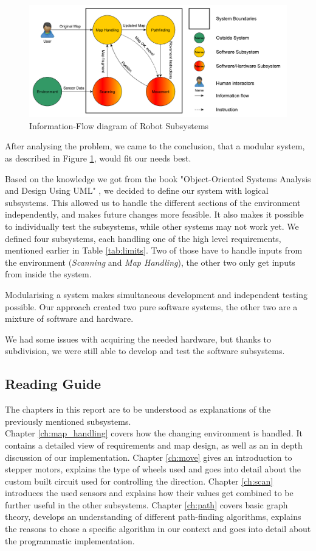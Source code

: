 \begin{figure}[!ht]
	\centering
	\includegraphics[width=\textwidth]{figures/intro/systemview}
	\caption{Information-Flow diagram of Robot Subsystems}
	\label{fig:system} 
\end{figure}
After analysing the problem,
we came to the conclusion,
that a modular system,
as described in Figure \ref{fig:system},
would fit our needs best.

Based on the knowledge we got from the book
"Object-Oriented Systems Analysis and Design  Using UML" \cite{Benett2010},
we decided to define our system with logical subsystems.
This allowed us to handle the different sections of the environment independently,
and makes future changes more feasible.
It also makes it possible to individually test the subsystems,
while other systems may not work yet.
We defined four subsystems, each handling one of the high level requirements,
mentioned earlier in Table \ref{tab:limits}.
Two of those have to handle inputs from the environment (\emph{Scanning} and \emph{Map Handling}),
the other two only get inputs from inside the system.

Modularising a system makes simultaneous development
and independent testing possible.
Our approach created two pure software systems,
the other two are a mixture of software and hardware.

We had some issues with acquiring the needed hardware,
but thanks to subdivision,
we were still able to develop and test the software subsystems.

\subsection*{Reading Guide}
The chapters in this report are to be understood as explanations of the previously mentioned subsystems.\\
Chapter \ref{ch:map_handling} covers how the changing environment is handled.
It contains a detailed view of requirements and map design,
as well as an in depth discussion of our implementation.
Chapter \ref{ch:move} gives an introduction to stepper motors, explains the type of wheels used and goes into detail about the custom built circuit used for controlling the direction.
Chapter \ref{ch:scan} introduces the used sensors and 
explains how their values get combined to be further useful in the other subsystems.
Chapter \ref{ch:path} covers basic graph theory,
develops an understanding of different path-finding algorithms,
explains the reasons to chose a specific algorithm in our context and
goes into detail about the programmatic implementation.

